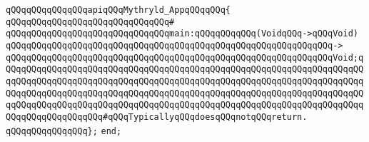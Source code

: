 \newline
\verb|qQQqqQQqqQQqqQQqapiqQQqMythryld_AppqQQqqQQq{|\newline
\verb|qQQqqQQqqQQqqQQqqQQqqQQqqQQqqQQq#|\newline
\verb|qQQqqQQqqQQqqQQqqQQqqQQqqQQqqQQqmain:qQQqqQQqqQQq(VoidqQQq->qQQqVoid)|\newline
\verb|qQQqqQQqqQQqqQQqqQQqqQQqqQQqqQQqqQQqqQQqqQQqqQQqqQQqqQQqqQQqqQQq->|\newline
\verb|qQQqqQQqqQQqqQQqqQQqqQQqqQQqqQQqqQQqqQQqqQQqqQQqqQQqqQQqqQQqqQQqVoid;qQQqqQQqqQQqqQQqqQQqqQQqqQQqqQQqqQQqqQQqqQQqqQQqqQQqqQQqqQQqqQQqqQQqqQQqqQQqqQQqqQQqqQQqqQQqqQQqqQQqqQQqqQQqqQQqqQQqqQQqqQQqqQQqqQQqqQQqqQQqqQQqqQQqqQQqqQQqqQQqqQQqqQQqqQQqqQQqqQQqqQQqqQQqqQQqqQQqqQQqqQQqqQQqqQQqqQQqqQQqqQQqqQQqqQQqqQQqqQQqqQQqqQQqqQQqqQQqqQQqqQQqqQQqqQQqqQQqqQQqqQQqqQQqqQQqqQQqqQQq#qQQqTypicallyqQQqdoesqQQqnotqQQqreturn.|\newline
\verb|qQQqqQQqqQQqqQQq};|\newline
\verb|end;|\newline

